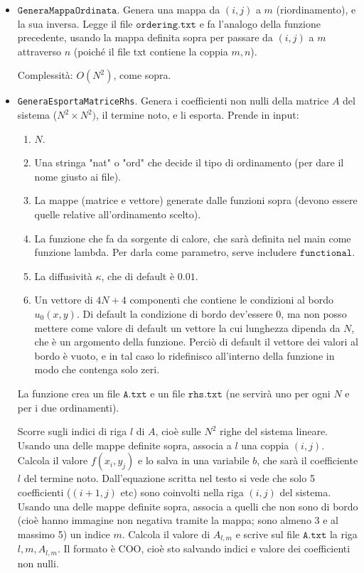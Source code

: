 \documentclass{article}
\begin{document}
\begin{itemize}
\item $\texttt{GeneraMappaOrdinata}$.
Genera una mappa da $(i,j)$ a $m$ (riordinamento), e la sua inversa.
Legge il file $\texttt{ordering.txt}$ e fa l'analogo della funzione precedente, usando la mappa definita sopra per passare da $(i,j)$ a $m$ attraverso $n$ (poiché il file txt contiene la coppia $m,n$).

Complessità: $O(N^2)$, come sopra.

\item \texttt{GeneraEsportaMatriceRhs}.
Genera i coefficienti non nulli della matrice $A$ del sistema ($N^2 \times N^2)$, il termine noto, e li esporta.
Prende in input:
\begin{enumerate}
\item $N$.
\item Una stringa "nat" o "ord" che decide il tipo di ordinamento (per dare il nome giusto ai file).
\item La mappe (matrice e vettore) generate dalle funzioni sopra (devono essere quelle relative all'ordinamento scelto).
\item La funzione che fa da sorgente di calore, che sarà definita nel main come funzione lambda.
Per darla come parametro, serve includere $\texttt{functional}$.
\item La diffusività $\kappa$, che di default è $0.01$.
\item Un vettore di $4N+4$ componenti che contiene le condizioni al bordo $u_0(x,y)$.
Di default la condizione di bordo dev'essere 0, ma non posso mettere come valore di default un vettore la cui lunghezza dipenda da $N$, che è un argomento della funzione.
Perciò di default il vettore dei valori al bordo è vuoto, e in tal caso lo ridefinisco all'interno della funzione in modo che contenga solo zeri.
\end{enumerate}

La funzione crea un file $\texttt{A.txt}$ e un file $\texttt{rhs.txt}$ (ne servirà uno per ogni $N$ e per i due ordinamenti).

Scorre sugli indici di riga $l$ di $A$, cioè sulle $N^2$ righe del sistema lineare.
Usando una delle mappe definite sopra, associa a $l$ una coppia $(i,j)$.
Calcola il valore $f(x_i,y_j)$ e lo salva in una variabile $b$, che sarà il coefficiente $l$ del termine noto.
Dall'equazione scritta nel testo si vede che solo 5 coefficienti ($(i+1,j)$ etc) sono coinvolti nella riga $(i,j)$ del sistema.
Usando una delle mappe definite sopra, associa a quelli che non sono di bordo (cioè hanno immagine non negativa tramite la mappa; sono almeno 3 e al massimo 5) un indice $m$.
Calcola il valore di $A_{l,m}$ e scrive sul file $\texttt{A.txt}$ la riga $l,m,A_{l,m}$.
Il formato è COO, cioè sto salvando indici e valore dei coefficienti non nulli.


\end{itemize}
\end{document}
